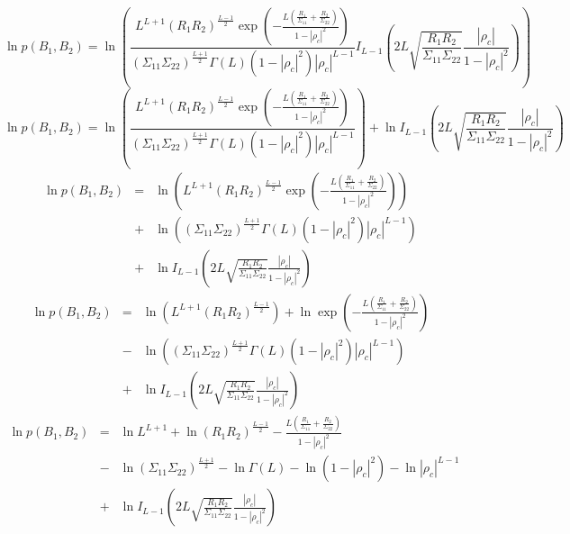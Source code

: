 \documentclass[remotesensing,article,submit,moreauthors,pdftex]{Definitions/mdpi}
\begin{document}
\begin{equation}\nonumber
	\ln p(B_1,B_2)=\ln\left(\frac{L^{L+1}\left(R_1R_2\right)^{\frac{L-1}{2}}\exp\left(-\frac{L(\frac{R_1}{\Sigma_{11}}+\frac{R_2}{\Sigma_{22}})}{1-|\rho_c|^2}\right)}{(\Sigma_{11}\Sigma_{22})^{\frac{L+1}{2}}\Gamma(L)(1-|\rho_c|^2)|\rho_c|^{L-1}}I_{L-1}\left(2L\sqrt{\frac{R_1R_2}{\Sigma_{11}\Sigma_{22}}}\frac{|\rho_c|}{1-|\rho_c|^2}\right)\right)
\end{equation}
\begin{equation}\nonumber
	\ln p(B_1,B_2)=\ln\left(\frac{L^{L+1}\left(R_1R_2\right)^{\frac{L-1}{2}}\exp\left(-\frac{L(\frac{R_1}{\Sigma_{11}}+\frac{R_2}{\Sigma_{22}})}{1-|\rho_c|^2}\right)}{(\Sigma_{11}\Sigma_{22})^{\frac{L+1}{2}}\Gamma(L)(1-|\rho_c|^2)|\rho_c|^{L-1}}\right) +\ln I_{L-1}\left(2L\sqrt{\frac{R_1R_2}{\Sigma_{11}\Sigma_{22}}}\frac{|\rho_c|}{1-|\rho_c|^2}\right)
\end{equation}
\begin{equation}\nonumber
\begin{array}{ccc}
	\ln p(B_1,B_2)&=&\ln\left(L^{L+1}\left(R_1R_2\right)^{\frac{L-1}{2}}\exp\left(-\frac{L(\frac{R_1}{\Sigma_{11}}+\frac{R_2}{\Sigma_{22}})}{1-|\rho_c|^2}\right)\right)\\
	&+&\ln\left((\Sigma_{11}\Sigma_{22})^{\frac{L+1}{2}}\Gamma(L)(1-|\rho_c|^2)|\rho_c|^{L-1}\right) \\
	&+&\ln I_{L-1}\left(2L\sqrt{\frac{R_1R_2}{\Sigma_{11}\Sigma_{22}}}\frac{|\rho_c|}{1-|\rho_c|^2}\right)
\end{array}
\end{equation}
\begin{equation}\nonumber
\begin{array}{ccc}
	\ln p(B_1,B_2)&=&\ln\left(L^{L+1}\left(R_1R_2\right)^{\frac{L-1}{2}}\right) + \ln \exp\left(-\frac{L(\frac{R_1}{\Sigma_{11}}+\frac{R_2}{\Sigma_{22}})}{1-|\rho_c|^2}\right)\\
	&-&\ln\left((\Sigma_{11}\Sigma_{22})^{\frac{L+1}{2}}\Gamma(L)(1-|\rho_c|^2)|\rho_c|^{L-1}\right) \\
	&+&\ln I_{L-1}\left(2L\sqrt{\frac{R_1R_2}{\Sigma_{11}\Sigma_{22}}}\frac{|\rho_c|}{1-|\rho_c|^2}\right)
\end{array}
\end{equation}
\begin{equation}\nonumber
\begin{array}{ccc}
	\ln p(B_1,B_2)&=&\ln L^{L+1} + \ln (R_1R_2)^{\frac{L-1}{2}} -\frac{L(\frac{R_1}{\Sigma_{11}}+\frac{R_2}{\Sigma_{22}})}{1-|\rho_c|^2}\\
	&-&\ln(\Sigma_{11}\Sigma_{22})^{\frac{L+1}{2}} - \ln\Gamma(L)- \ln(1-|\rho_c|^2)-\ln|\rho_c|^{L-1} \\
	&+&\ln I_{L-1}\left(2L\sqrt{\frac{R_1R_2}{\Sigma_{11}\Sigma_{22}}}\frac{|\rho_c|}{1-|\rho_c|^2}\right)
\end{array}
\end{equation}
\end{document}
